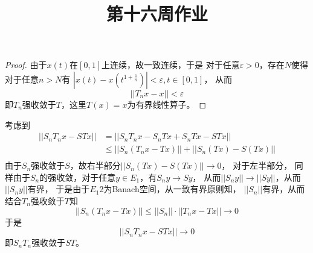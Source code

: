 \documentclass[cn]{homework}
\title{第十六周作业}
\begin{document}
    \maketitle

    \problem
    \begin{proof}
        由于$x(t)$在$[0,1]$上连续，故一致连续，于是
        对于任意$\varepsilon>0$，存在$N$使得对于任意$n>N$有
        $\left|x(t)-x(t^{1+\frac{1}{n}})\right|<\varepsilon,t\in[0,1]$，
        从而
        \[||T_n x-x||<\varepsilon\]
        即$T_n$强收敛于$T$，这里$T(x)=x$为有界线性算子。

    \end{proof}
    
    \problem
    考虑到
    \[\begin{aligned}
        ||S_nT_nx-STx||&=||S_nT_nx-S_nTx+S_nTx-STx||\\
        &\leq||S_n(T_nx-Tx)||+||S_n(Tx)-S(Tx)||\\
    \end{aligned}\]
    由于$S_n$强收敛于$S$，故右半部分$||S_n(Tx)-S(Tx)||\to 0$，
    对于左半部分，
    同样由于$S_n$的强收敛，对于任意$y\in E_1$，有$S_ny\to Sy$，
    从而$||S_ny||\to ||Sy||$，从而$||S_ny||$有界，
    于是由于$E_1$2为Banach空间，从一致有界原则知，
    $||S_n||$有界，从而结合$T_n$强收敛于$T$知
    \[||S_n(T_nx-Tx)||\leq ||S_n||\cdot||T_nx-Tx||\to 0\]
    于是
    \[||S_nT_nx-STx||\to 0\]
    即$S_nT_n$强收敛于$ST$。
\end{document}
